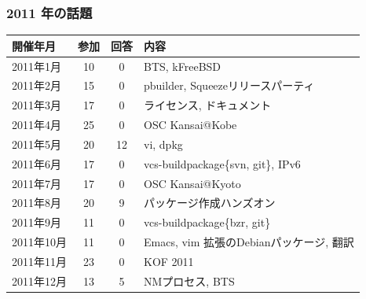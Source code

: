 \documentclass[cjk,dvipdfmx,10pt,compress,%
hyperref={bookmarks=true,bookmarksnumbered=true,bookmarksopen=false,%
colorlinks=false,%
pdftitle={第 121 回 関西 Debian 勉強会},%
pdfauthor={倉敷・のがた・佐々木・かわだ},%
pdfsubject={資料},%
}]{beamer}
\begin{document}
\begin{frame}[fragile]
  \frametitle{2011 年の話題}
    \begin{table}
        \begin{center}
          \begin{tabular}{|l|c|c|p{16em}|}
            \hline
            開催年月  & 参加 & 回答 & 内容 \\
            \hline
            2011年1月 &10    & 0    & BTS, kFreeBSD\\
            2011年2月 &15    & 0    & pbuilder, Squeezeリリースパーティ\\
            2011年3月 &17    & 0    & ライセンス, ドキュメント\\
            2011年4月 &25    & 0    & OSC Kansai@Kobe \\
            2011年5月 &20    &12    & vi, dpkg \\
            2011年6月 &17    & 0    & vcs-buildpackage\{svn, git\}, IPv6\\
            2011年7月 &17    & 0    & OSC Kansai@Kyoto \\
            2011年8月 &20    & 9    & パッケージ作成ハンズオン\\
            2011年9月 &11    & 0    & vcs-buildpackage\{bzr, git\}\\
            2011年10月&11    & 0    & Emacs, vim 拡張のDebianパッケージ, 翻訳\\
            2011年11月&23    & 0    & KOF 2011\\
            2011年12月&13    & 5    & NMプロセス, BTS\\
            \hline
          \end{tabular}
        \end{center}
    \end{table}
\end{frame}
\end{document}
